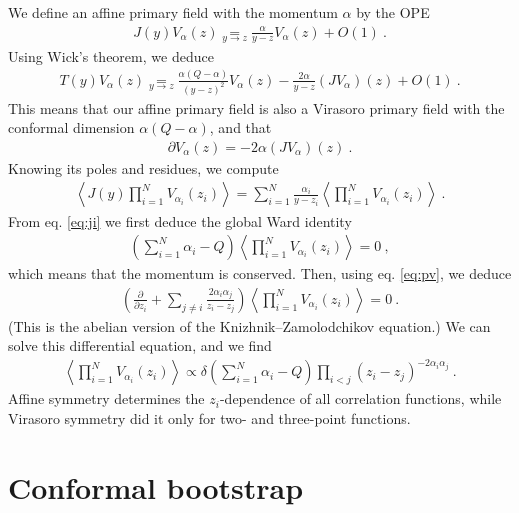 \documentclass[12pt, a4paper]{article}
\theoremstyle{break}
\begin{document}
We define an affine primary field with the momentum $\alpha$ by the OPE 
\begin{align}
 J(y) V_\alpha(z) \underset{y\to z}{=} \frac{\alpha}{y-z} V_\alpha(z) + O(1)\ .
\label{jva}
\end{align}
Using Wick's theorem, we deduce 
\begin{align}
 T(y) V_\alpha(z) \underset{y\to z}{=} \frac{\alpha(Q-\alpha) }{(y-z)^2}V_\alpha(z) - \frac{2\alpha}{y-z} (JV_\alpha)(z) + O(1)\ . 
\end{align}
This means that our affine primary field is also a Virasoro primary field with the conformal dimension $\alpha(Q-\alpha)$, and that 
\begin{align}
 \partial V_\alpha(z) = -2\alpha (JV_\alpha)(z)\ .
 \label{eq:pv}
\end{align}
Knowing its poles and residues, we compute 
\begin{align}
 \left< J(y) \prod_{i=1}^N V_{\alpha_i}(z_i)\right> = \sum_{i=1}^N\frac{\alpha_i}{y-z_i} \left<\prod_{i=1}^N V_{\alpha_i}(z_i)\right>\ .
\end{align}
From eq. \eqref{eq:ji} we first deduce the global Ward identity 
\begin{align}
 \left(\textstyle\sum_{i=1}^N \alpha_i - Q\right) \left\langle \prod_{i=1}^N V_{\alpha_i}(z_i) \right\rangle = 0 \ ,
\end{align}
which means that the momentum is conserved. Then, using eq. \eqref{eq:pv}, we deduce 
\begin{align}
\left( {\frac{\partial}{\partial z_i}} +\sum_{j\neq i} \frac{2\alpha_i\alpha_j}{z_i-z_j} \right) \left\langle \prod_{i=1}^N V_{\alpha_i}(z_i) \right\rangle = 0 \ .
\label{kzl}
\end{align}
(This is the abelian version of the Knizhnik--Zamolodchikov equation.) 
We can solve this differential equation, and we find
\begin{align}
 \left\langle \prod_{i=1}^N V_{\alpha_i}(z_i) \right\rangle \propto \delta\left(\textstyle\sum_{i=1}^N \alpha_i - Q\right) \prod_{i<j} (z_i-z_j)^{-2\alpha_i\alpha_j}\ .
\end{align}
Affine symmetry determines the $z_i$-dependence of all correlation functions, while Virasoro symmetry did it only for two- and three-point functions. 

\section{Conformal bootstrap}
\end{document}
